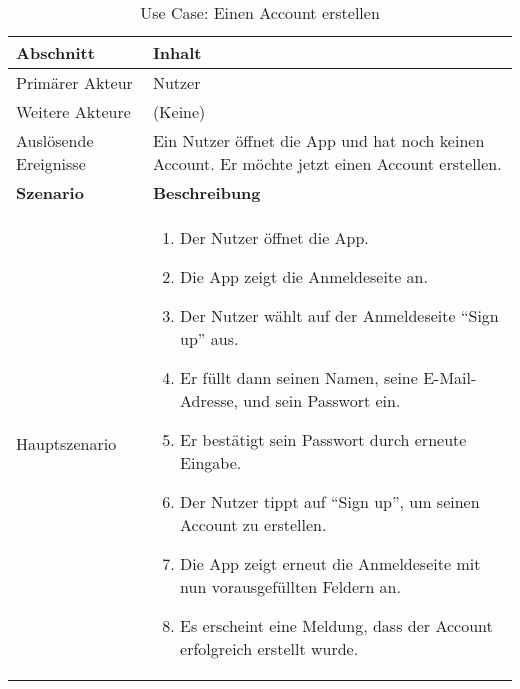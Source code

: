\begin{table}[H]
	\footnotesize
	\caption{Use Case: Einen Account erstellen}
	\begin{tabularx}{0.95\textwidth}{ |l|X| }
		\hline
		\rowcolor{gray} \textbf{Abschnitt}     & \textbf{Inhalt}                                                                                                                                       \\
		\hline
		Primärer Akteur                        & Nutzer                                                                                                                                                \\
		\hline
		Weitere Akteure                        & (Keine)                                                                                                                                               \\
		\hline
		Auslösende Ereignisse                  & Ein Nutzer öffnet die App und hat noch keinen Account. Er möchte jetzt einen Account erstellen.                                                       \\
		\hline
		\rowcolor{lightgray} \textbf{Szenario} & \textbf{Beschreibung}                                                                                                                                 \\
		\hline
		Hauptszenario                          & \begin{enumerate}[noitemsep]
			                                         \item Der Nutzer öffnet die App.
			                                         \item Die App zeigt die Anmeldeseite an.
			                                         \item Der Nutzer wählt auf der Anmeldeseite \enquote{Sign up} aus.
			                                         \item Er füllt dann seinen Namen, seine E-Mail-Adresse, und sein Passwort ein.
			                                         \item Er bestätigt sein Passwort durch erneute Eingabe.
			                                         \item Der Nutzer tippt auf \enquote{Sign up}, um seinen Account zu erstellen.
			                                         \item Die App zeigt erneut die Anmeldeseite mit nun vorausgefüllten Feldern an.
			                                         \item Es erscheint eine Meldung, dass der Account erfolgreich erstellt wurde.

\end{enumerate}
\end{tabularx}
\end{table}
